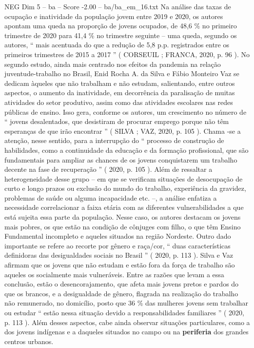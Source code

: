 \begin{textsample}{NEG Dim 5 – ba – Score -2.00 – ba/ba\_em\_16.txt}
Na análise das taxas de ocupação e inatividade da população jovem entre 2019 e 2020, os autores apontam uma queda na proporção de jovens ocupados, de 48,6 \% no primeiro trimestre de 2020 para 41,4 \% no trimestre seguinte – uma queda, segundo os autores, “ mais acentuada do que a redução de 5,8 p.p. registrados entre os primeiros trimestres de 2015 a 2017 ” ( CORSEUIL ; FRANCA, 2020, p. 96 ).
No segundo estudo, ainda mais centrado nos efeitos da pandemia na relação juventude-trabalho no Brasil, Enid Rocha A. da Silva e Fábio Monteiro Vaz se dedicam àqueles que não trabalham e não estudam, salientando, entre outros aspectos, o aumento da inatividade, em decorrência da paralisação de muitas atividades do setor produtivo, assim como das atividades escolares nas redes públicas de ensino.
Isso gera, conforme os autores, um crescimento no número de “ jovens desalentados, que desistiram de procurar emprego porque não têm esperanças de que irão encontrar ” ( SILVA ; VAZ, 2020, p. 105 ).
Chama -se a atenção, nesse sentido, para a interrupção do “ processo de construção de habilidades, como a continuidade da educação e da formação profissional, que são fundamentais para ampliar as chances de os jovens conquistarem um trabalho decente na fase de recuperação ” ( 2020, p. 105 ).
Além de ressaltar a heterogeneidade desse grupo – em que se verificam situações de desocupação de curto e longo prazos ou exclusão do mundo do trabalho, experiência da gravidez, problemas de saúde ou alguma incapacidade etc. –, a análise enfatiza a necessidade correlacionar a faixa etária com as diferentes vulnerabilidades a que está sujeita essa parte da população.
Nesse caso, os autores destacam os jovens mais pobres, os que estão na condição de cônjuges com filho, o que têm Ensino Fundamental incompleto e aqueles situados na região Nordeste.
Outro dado importante se refere ao recorte por gênero e raça/cor, “ duas características definidoras das desigualdades sociais no Brasil ” ( 2020, p. 113 ).
Silva e Vaz afirmam que os jovens que não estudam e estão fora da força de trabalho são aqueles os socialmente mais vulneráveis.
Entre as razões que levam a essa conclusão, estão o desencorajamento, que afeta mais jovens pretos e pardos do que os brancos, e a desigualdade de gênero, flagrada na realização do trabalho não remunerado, no domicílio, posto que 36 \% das mulheres jovens sem trabalhar ou estudar “ estão nessa situação devido a responsabilidades familiares ” ( 2020, p. 113 ).
Além desses aspectos, cabe ainda observar situações particulares, como a dos jovens indígenas e a daqueles situados no campo ou na \textbf{periferia} dos grandes centros urbanos.

\end{textsample}
